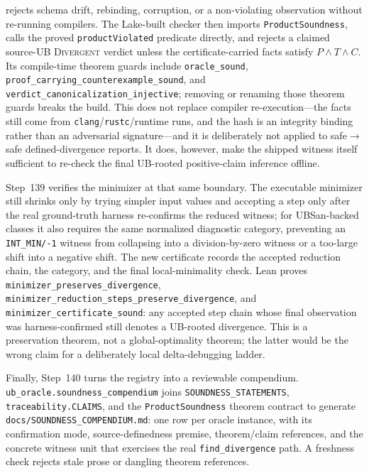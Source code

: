 \documentclass[10pt,a4paper]{article}
\begin{document}
rejects schema drift, rebinding, corruption, or a non-violating observation
without re-running compilers.  The Lake-built checker then imports
\texttt{ProductSoundness}, calls the proved
\texttt{productViolated} predicate directly, and rejects a claimed source-UB
\textsc{Divergent} verdict unless the certificate-carried facts satisfy
\(P \wedge T \wedge C\). Its compile-time theorem guards include
\texttt{oracle\_sound}, \texttt{proof\_carrying\_counterexample\_sound}, and
\texttt{verdict\_canonicalization\_injective}; removing or renaming those theorem
guards breaks the build. This does not replace compiler re-execution---the facts still come from
\texttt{clang}/\texttt{rustc}/runtime runs, and the hash is an integrity binding
rather than an adversarial signature---and it is deliberately not applied to
safe$\to$safe defined-divergence reports. It does, however, make the shipped
witness itself sufficient to re-check the final UB-rooted positive-claim
inference offline.

Step~139 verifies the minimizer at that same boundary.  The executable minimizer
still shrinks only by trying simpler input values and accepting a step only after
the real ground-truth harness re-confirms the reduced witness; for UBSan-backed
classes it also requires the same normalized diagnostic category, preventing an
\texttt{INT\_MIN/-1} witness from collapsing into a division-by-zero witness or a
too-large shift into a negative shift.  The new certificate records the accepted
reduction chain, the category, and the final local-minimality check.  Lean proves
\texttt{minimizer\_preserves\_divergence},
\texttt{minimizer\_reduction\_steps\_preserve\_divergence}, and
\texttt{minimizer\_certificate\_sound}: any accepted step chain whose final
observation was harness-confirmed still denotes a UB-rooted divergence.  This is
a preservation theorem, not a global-optimality theorem; the latter would be the
wrong claim for a deliberately local delta-debugging ladder.

Finally, Step~140 turns the registry into a reviewable compendium.
\texttt{ub\_oracle.soundness\_compendium} joins
\texttt{SOUNDNESS\_STATEMENTS}, \texttt{traceability.CLAIMS}, and the
\texttt{ProductSoundness} theorem contract to generate
\texttt{docs/SOUNDNESS\_COMPENDIUM.md}: one row per oracle instance, with its
confirmation mode, source-definedness premise, theorem/claim references, and the
concrete witness unit that exercises the real \texttt{find\_divergence} path. A
freshness check rejects stale prose or dangling theorem references.
\end{document}
